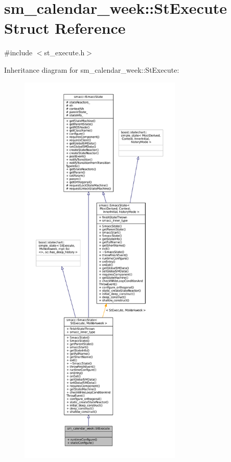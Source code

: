 \hypertarget{structsm__calendar__week_1_1StExecute}{}\section{sm\+\_\+calendar\+\_\+week\+:\+:St\+Execute Struct Reference}
\label{structsm__calendar__week_1_1StExecute}


{\ttfamily \#include $<$st\+\_\+execute.\+h$>$}



Inheritance diagram for sm\+\_\+calendar\+\_\+week\+:\+:St\+Execute\+:
\nopagebreak
\begin{figure}[H]
\begin{center}
\leavevmode
\includegraphics[height=550pt]{structsm__calendar__week_1_1StExecute__inherit__graph}
\end{center}
\end{figure}


